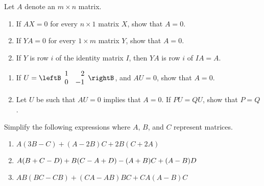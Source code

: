\begin{multicols}{2}
\begin{ex}
\begin{sol}
\begin{enumerate}[label={\alph*.}]
\end{enumerate}
\end{sol}
\end{ex}

\begin{ex}
Let $A$ denote an $m \times n$ matrix.


\begin{enumerate}[label={\alph*.}]
\item If $AX = 0$ for every $n \times 1$ matrix $X$, show that $A = 0$.

\item If $YA = 0$ for every $1 \times m$ matrix $Y$, show that $A = 0$.

\end{enumerate}
\begin{sol}
\begin{enumerate}[label={\alph*.}]
\setcounter{enumi}{1}
\item  If $Y$ is row $i$ of the identity matrix $I$, then $YA$ is row $i$ of $IA = A$.

\end{enumerate}
\end{sol}
\end{ex}

\begin{ex}
\begin{enumerate}[label={\alph*.}]
\item If $U = \leftB \begin{array}{rr}
1 & 2 \\
0 & -1
\end{array} \rightB$, and $AU = 0$, show that $A = 0$.

\item Let $U$ be such that $AU = 0$ implies that $A = 0$. If $PU = QU$, show that $P = Q$.

\end{enumerate}
\end{ex}

\begin{ex}
Simplify the following expressions where $A$, $B$, and $C$ represent matrices.


\begin{enumerate}[label={\alph*.}]
\item $A(3B - C) + (A - 2B)C + 2B(C + 2A)$

\item $A(B + C - D) + B(C - A + D) - (A + B)C \\ + (A - B)D$

\item $AB(BC - CB) + (CA - AB)BC + CA(A - B)C$


\end{enumerate}
\end{ex}
\end{multicols}
